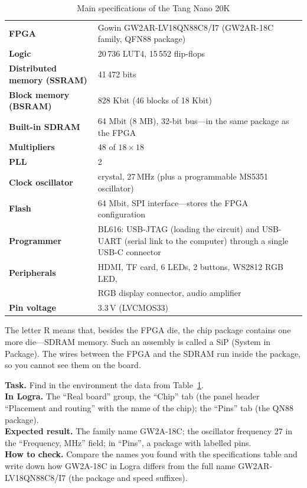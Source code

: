 \begin{table}[H]
\centering
\caption{Main specifications of the Tang Nano 20K}
\label{tab:specs}
\small
\begin{tabularx}{0.95\textwidth}{>{\bfseries}l X}
\toprule
FPGA                 & Gowin GW2AR-LV18QN88C8/I7 (GW2AR-18C family, QFN88 package) \\
Logic                & 20\,736 LUT4, 15\,552 flip-flops \\
Distributed memory (SSRAM) & 41\,472 bits \\
Block memory (BSRAM) & 828 Kbit (46 blocks of 18 Kbit) \\
Built-in SDRAM       & 64 Mbit (8 MB), 32-bit bus---in the same package as the FPGA \\
Multipliers          & 48 of $18\times18$ \\
PLL                  & 2 \\
Clock oscillator     & crystal, 27\,MHz (plus a programmable MS5351 oscillator) \\
Flash                & 64 Mbit, SPI interface---stores the FPGA configuration \\
Programmer           & BL616: USB-JTAG (loading the circuit) and USB-UART (serial link to the computer) through a single USB-C connector \\
Peripherals          & HDMI, TF card, 6 LEDs, 2 buttons, WS2812 RGB LED, \\
                     & RGB display connector, audio amplifier \\
Pin voltage          & 3.3\,V (LVCMOS33) \\
\bottomrule
\end{tabularx}
\end{table}

\begin{infobox}
The letter R means that, besides the FPGA die, the chip package contains one
more die---SDRAM memory. Such an assembly is called a SiP
(System in Package). The wires between the FPGA and the SDRAM run inside the
package, so you cannot see them on the board.
\end{infobox}

\begin{diybox}
\textbf{Task.} Find in the environment the data from Table~\ref{tab:specs}.\\
\textbf{In Logra.} The ``Real board'' group, the ``Chip'' tab (the panel header ``Placement and routing'' with the name of the chip); the ``Pins'' tab (the QN88 package).\\
\textbf{Expected result.} The family name GW2A-18C; the oscillator frequency 27 in the ``Frequency, MHz'' field; in ``Pins'', a package with labelled pins.\\
\textbf{How to check.} Compare the names you found with the specifications table and write down how GW2A-18C in Logra differs from the full name GW2AR-LV18QN88C8/I7 (the package and speed suffixes).
\end{diybox}

